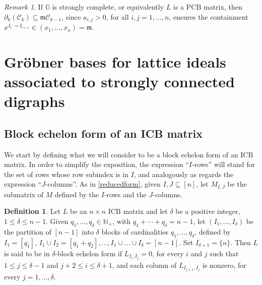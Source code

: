 \documentclass[10pt]{amsart}
\newcommand{\mbn}{\mbox{$\mathbb{N}$}}
\newcommand{\mbg}{\mbox{$\mathbb{G}$}}
\newcommand{\mcc}{\mbox{$\mathcal{C}$}}
\newcommand{\icb}{\mbox{$\mathrm{ICB}$}}
\newcommand{\pcb}{\mbox{$\mathrm{PCB}$}}
\newcommand{\mfm}{\mbox{$\mathfrak{m}$}}
\newcommand{\dif}{\mbox{$\partial$}}
\theoremstyle{definition}
\newtheorem{definition}[cdrthm]{Definition}
\theoremstyle{remark}
\newtheorem{remark}[cdrthm]{Remark}
\begin{document}
\begin{remark}\label{dif-m}
If $\mbg$ is strongly complete, or equivalently $L$ is a $\pcb$
matrix, then $\dif_k(\mcc_k)\subseteq \mfm\mcc_{k-1}$, since
$a_{i,j}>0$, for all $i,j=1,\ldots ,n$, ensures the containment
$x^{I_t\to I_{t+1}}\in (x_1,\ldots ,x_n)=\mfm$.
\end{remark}

\section{Gr\"obner bases for lattice ideals associated to 
strongly connected digraphs}

\subsection{Block echelon form of an ICB matrix}\label{block-icb}

 We start by defining what we will consider to be a block
echelon form of an $\icb$ matrix. In order to simplify the exposition,
the expression ``$I$-rows'' will stand for the set of rows whose row
subindex is in $I$, and analogously as regards the expression
``$J$-columns''. As in \eqref{reducedform}, given $I,J\subseteq [n]$,
let $M_{I,J}$ be the submatrix of $M$ defined by the $I$-rows and the
$J$-columns.

\begin{definition}\label{def-echelon}
Let $L$ be an $n\times n$ $\icb$ matrix and let $\delta$ be a positive
integer, $1\leq \delta\leq n-1$. Given $q_1,\ldots ,q_\delta\in
\mbn_+$, with $q_1+\cdots+q_\delta=n-1$, let $(I_1,\ldots ,I_\delta)$
be the partition of $[n-1]$ into $\delta$ blocks of cardinalities
$q_1,\ldots ,q_\delta$, defined by $I_1=[q_1]$, $I_1\cup
I_2=[q_1+q_2],\ldots ,I_1\cup\ldots\cup I_\delta=[n-1]$.  Set
$I_{\delta+1}=\{n\}$. Then $L$ is said to be in $\delta$-block echelon
form if $L_{I_{i},I_{j}}=0$, for every $i$ and $j$ such that $1\leq
j\leq \delta-1$ and $j+2\leq i\leq \delta+1$, and each column of
$L_{I_{j+1},I_j}$ is nonzero, for every $j=1,\ldots ,\delta$.
\end{definition}
\end{document}
